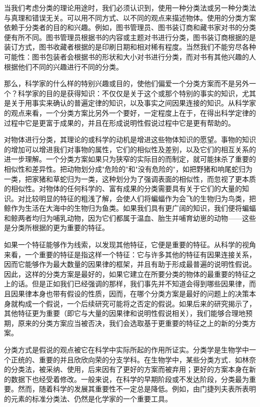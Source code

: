 当我们考虑分类的理论用途时，我们必须认识到，使用一种分类法或另一种分类法与真理和错误无关。可以用不同方式、以不同的观点来描述物体。使用的分类方案依赖于分类者的目的和兴趣。例如，图书管理员、图书装订商和藏书家对书的分类便有所不同。图书管理员根据书的内容或主题对书进行分类，图书装订商根据的是装订方式，图书收藏者根据的是印刷日期和相对稀有程度。当然我们不能穷尽各种可能性：图书包装者会根据书的形状和大小对书进行分类，而对书有其他兴趣的人根据他们不同的兴趣进行不同的分类。

那么，科学家的什么样的特别兴趣或目的，使他们偏爱一个分类方案而不是另外一个？科学家的目的是获得知识：不仅仅是关于这个或那个特别的事实的知识，尤其是关于用事实来确认的普遍定律的知识，以及事实之间因果连接的知识。从科学家的观点来看，一个分类方案比另外一个要好，一定程度上在于，在得出科学定律的过程中它是更富于成果的，并且在形成说明性假说过程中它是更有帮助的。

对物体进行分类，其理论的或科学的动机是增进这些物体知识的愿望。事物的知识的增加可以增进我们对事物的属性，它们的相似性及差别，以及它们的相互关系的进一步理解。一个分类方案如果只为狭窄的实际目的而制定，就可能抹杀了重要的相似性和差异性。把动物划分成"危险的"和"没有危险的"，如把野猪和响尾蛇归为一类，把家猪和草蛇归为一类，这种划分为了强调表面的相似性，而忽视了更本质的相似性。对物体的任何科学的、富有成果的分类需要具有关于它们的大量的知识。对比较明显的特征的粗浅了解，会使人们将蝙蝠作为会飞的生物归为鸟类，把鲸作为生活在大海中的生物归为鱼类。如果我们具有更广阔的知识，我们便将蝙蝠和鲸两者均归为哺乳动物，因为它们都属于温血、胎生并哺育幼崽的动物——这些是分类所根据的更为重要的特征。

如果一个特征能够作为线索，以发现其他特征，它便是重要的特征。从科学的视角来看，一个重要的特征是指这样一个特征：它与许多其他的特征有因果连接关系，因而它能够作为最大数量的因果律的框架，并且有助于形成最普遍的说明性假说。因此，这样的分类方案是最好的，如果它建立在所要分类的物体的最重要的特征之上的话。但是正如我们已经强调的那样，我们事先并不知道会得到哪些因果律，而且因果律本身也带有假设的性质，因而，在哪个分类方案是最好的问题上的决策本身就构成一个假说，一个后续研究可能将之否定的假说。如果后来的研究揭示了，其他特征更为重要（即它与大量的因果律和说明性假说相关），我们能够合理地预期，原来的分类方案应当被否决，我们会选取基于更重要的特征之上的新的分类方案。

分类方式是假说的观点被它在科学中实际所起的作用所证实。分类学是生物学中一个正统的、重要的并且欣欣向荣的分支学科。在生物学中，某些分类方式．如林奈的分类法，被采纳、使用，后来因有了更好的方案而被弃用；更好的方案本身在新的数据下也经受着修改。一般来说，在科学的早期阶段或不发达阶段，分类最为重要。然而，随着科学的发展其重要性不一定总是降低。例如，由门捷列夫表所表明的元素的标准分类法、仍然是化学家的一个重要工具。

